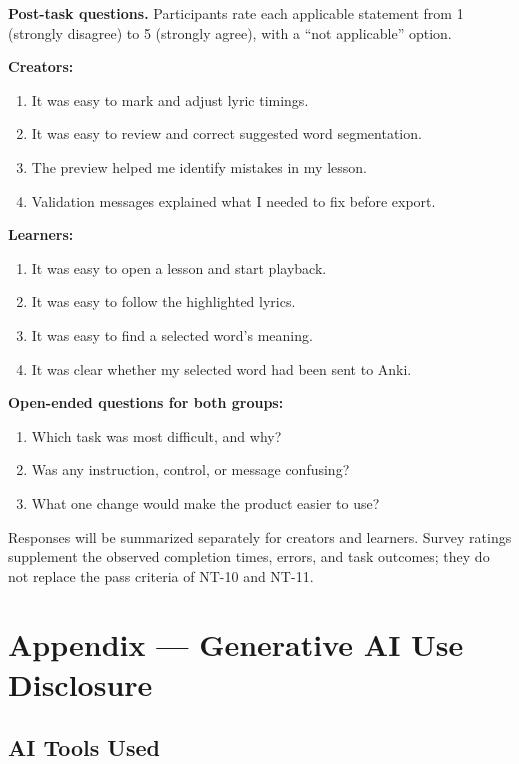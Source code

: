 \documentclass[12pt, titlepage]{article}
\begin{document}
\textbf{Post-task questions.}
Participants rate each applicable statement from 1 (strongly disagree)
to 5 (strongly agree), with a ``not applicable'' option.

\textbf{Creators:}
\begin{enumerate}
  \item It was easy to mark and adjust lyric timings.
  \item It was easy to review and correct suggested word segmentation.
  \item The preview helped me identify mistakes in my lesson.
  \item Validation messages explained what I needed to fix before export.
\end{enumerate}

\textbf{Learners:}
\begin{enumerate}
  \item It was easy to open a lesson and start playback.
  \item It was easy to follow the highlighted lyrics.
  \item It was easy to find a selected word's meaning.
  \item It was clear whether my selected word had been sent to Anki.
\end{enumerate}

\textbf{Open-ended questions for both groups:}
\begin{enumerate}
  \item Which task was most difficult, and why?
  \item Was any instruction, control, or message confusing?
  \item What one change would make the product easier to use?
\end{enumerate}

Responses will be summarized separately for creators and learners.
Survey ratings supplement the observed completion times, errors, and
task outcomes; they do not replace the pass criteria of NT-10 and NT-11.

\newpage{}

\section{Appendix --- Generative AI Use Disclosure}

\subsection{AI Tools Used}
\end{document}
